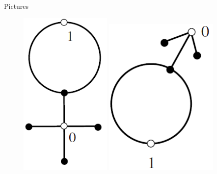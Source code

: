 \documentclass[pdf]{beamer}
\numberwithin{equation}{section}
\theoremstyle{plain}
\theoremstyle{plain}
\theoremstyle{remark}
\begin{document}
\begin{frame}[fragile]{Pictures}
\begin{figure}[th]
	\begin{minipage}[b]{.4\textwidth}
		\centering
		\includegraphics[width=0.4\textwidth]{figures/Fig4-32-1.png}
	\end{minipage}
	\begin{minipage}[b]{.4\textwidth}
	\centering
	\includegraphics[width=0.5\textwidth]{figures/Fig4-32-2.png}
\end{minipage}
\end{figure}
\end{frame}
\end{document}
